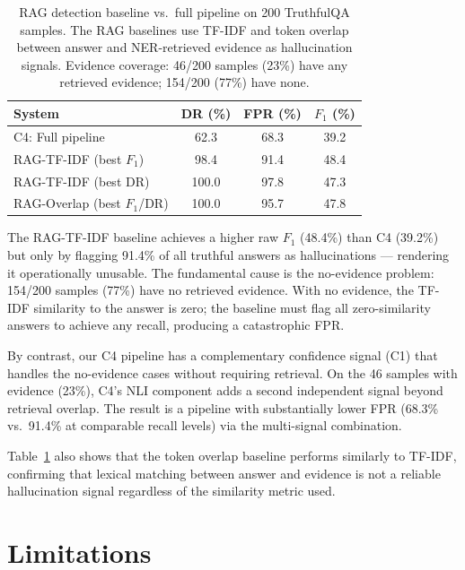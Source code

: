 \documentclass[11pt,a4paper]{article}
\newcommand{\fone}{F_1}
\begin{document}
\begin{table}[htb]
\centering
\caption{RAG detection baseline vs.\ full pipeline on 200 TruthfulQA samples.
The RAG baselines use TF-IDF and token overlap between answer and NER-retrieved
evidence as hallucination signals. Evidence coverage: 46/200 samples (23\%)
have any retrieved evidence; 154/200 (77\%) have none.}
\label{tab:ragbaseline}
\begin{tabular}{lccc}
\toprule
\textbf{System} & \textbf{DR (\%)} & \textbf{FPR (\%)} & \textbf{$\fone$ (\%)} \\
\midrule
C4: Full pipeline                & 62.3  & 68.3  & 39.2 \\
\midrule
RAG-TF-IDF (best $\fone$)        & 98.4  & 91.4  & 48.4 \\
RAG-TF-IDF (best DR)             & 100.0 & 97.8  & 47.3 \\
RAG-Overlap (best $\fone$/DR)    & 100.0 & 95.7  & 47.8 \\
\bottomrule
\end{tabular}
\end{table}

The RAG-TF-IDF baseline achieves a higher raw $\fone$ (48.4\%) than C4 (39.2\%)
but only by flagging 91.4\% of all truthful answers as hallucinations ---
rendering it operationally unusable. The fundamental cause is the no-evidence
problem: 154/200 samples (77\%) have no retrieved evidence. With no evidence,
the TF-IDF similarity to the answer is zero; the baseline must flag all
zero-similarity answers to achieve any recall, producing a catastrophic FPR.

By contrast, our C4 pipeline has a complementary confidence signal (C1) that
handles the no-evidence cases without requiring retrieval. On the 46 samples
with evidence (23\%), C4's NLI component adds a second independent signal beyond
retrieval overlap. The result is a pipeline with substantially lower FPR (68.3\%
vs.\ 91.4\% at comparable recall levels) via the multi-signal combination.

Table~\ref{tab:ragbaseline} also shows that the token overlap baseline performs
similarly to TF-IDF, confirming that lexical matching between answer and evidence
is not a reliable hallucination signal regardless of the similarity metric used.

\section{Limitations}
\label{sec:limitations}
\end{document}
